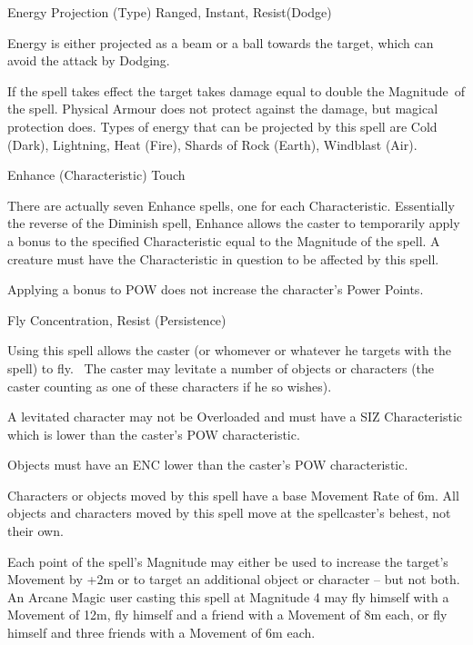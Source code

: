 \begin{samepage}
\begin{rpg-spell}
{Energy Projection (Type)}
{Ranged, Instant, Resist(Dodge)}

Energy is either projected as a beam or a ball towards the target, which can avoid the attack by Dodging.

If the spell takes effect the target takes damage equal to double the Magnitude of the spell. Physical Armour does not protect against the damage, but magical protection does. Types of energy that can be projected by this spell are Cold (Dark), Lightning, Heat (Fire), Shards of Rock (Earth), Windblast (Air).
\end{rpg-spell}
\end{samepage}


\begin{samepage}
\begin{rpg-spell}
{Enhance (Characteristic)}
{Touch}

There are actually seven Enhance spells, one for each Characteristic. Essentially the reverse of the Diminish spell, Enhance allows the caster to temporarily apply a bonus to the specified Characteristic equal to the Magnitude of the spell. A creature must have the Characteristic in question to be affected by this spell. 

Applying a bonus to POW does not increase the character’s Power Points. 
\end{rpg-spell}
\end{samepage}


\begin{samepage}
\begin{rpg-spell}
{Fly}
{Concentration, Resist (Persistence)}

Using this spell allows the caster (or whomever or whatever he targets with the spell) to fly.  The caster may levitate a number of objects or characters (the caster counting as one of these characters if he so wishes). 

A levitated character may not be Overloaded and must have a SIZ Characteristic which is lower than the caster’s POW characteristic. 

Objects must have an ENC lower than the caster’s POW characteristic. 

Characters or objects moved by this spell have a base Movement Rate of 6m. All objects and characters moved by this spell move at the spellcaster’s behest, not their own. 

Each point of the spell’s Magnitude may either be used to increase the target’s Movement by +2m or to target an additional object or character – but not both. An Arcane Magic user casting this spell at Magnitude 4 may fly himself with a Movement of 12m, fly himself and a friend with a Movement of 8m each, or fly himself and three friends with a Movement of 6m each.
\end{rpg-spell}
\end{samepage}


